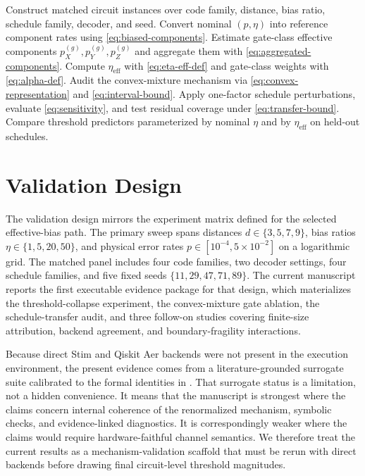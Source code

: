 \documentclass{article} %
\begin{document}
\begin{algorithm}[t]
\caption{Schedule-aware effective-bias audit workflow. The procedure takes compiled gate-class Pauli components, schedule weights, and temporal-fragility factors as inputs, then emits the effective-bias estimate, threshold-fit diagnostics, and transfer-bound residual checks used throughout the methods and results sections.}
\label{alg:audit}
\begin{algorithmic}
\STATE Construct matched circuit instances over code family, distance, bias ratio, schedule family, decoder, and seed.
\STATE Convert nominal $(p,\eta)$ into reference component rates using \eqref{eq:biased-components}.
\STATE Estimate gate-class effective components $p_X^{(g)}, p_Y^{(g)}, p_Z^{(g)}$ and aggregate them with \eqref{eq:aggregated-components}.
\STATE Compute $\eta_{\mathrm{eff}}$ with \eqref{eq:eta-eff-def} and gate-class weights with \eqref{eq:alpha-def}.
\STATE Audit the convex-mixture mechanism via \eqref{eq:convex-representation} and \eqref{eq:interval-bound}.
\STATE Apply one-factor schedule perturbations, evaluate \eqref{eq:sensitivity}, and test residual coverage under \eqref{eq:transfer-bound}.
\STATE Compare threshold predictors parameterized by nominal $\eta$ and by $\eta_{\mathrm{eff}}$ on held-out schedules.
\end{algorithmic}
\end{algorithm}

\section{Validation Design}
\label{sec:validation}

The validation design mirrors the experiment matrix defined for the selected effective-bias path. The primary sweep spans distances $d \in \{3,5,7,9\}$, bias ratios $\eta \in \{1,5,20,50\}$, and physical error rates $p \in [10^{-4},5\times 10^{-2}]$ on a logarithmic grid. The matched panel includes four code families, two decoder settings, four schedule families, and five fixed seeds $\{11,29,47,71,89\}$. The current manuscript reports the first executable evidence package for that design, which materializes the threshold-collapse experiment, the convex-mixture gate ablation, the schedule-transfer audit, and three follow-on studies covering finite-size attribution, backend agreement, and boundary-fragility interactions.

Because direct Stim and Qiskit Aer backends were not present in the execution environment, the present evidence comes from a literature-grounded surrogate suite calibrated to the formal identities in . That surrogate status is a limitation, not a hidden convenience. It means that the manuscript is strongest where the claims concern internal coherence of the renormalized mechanism, symbolic checks, and evidence-linked diagnostics. It is correspondingly weaker where the claims would require hardware-faithful channel semantics. We therefore treat the current results as a mechanism-validation scaffold that must be rerun with direct backends before drawing final circuit-level threshold magnitudes.
\end{document}
